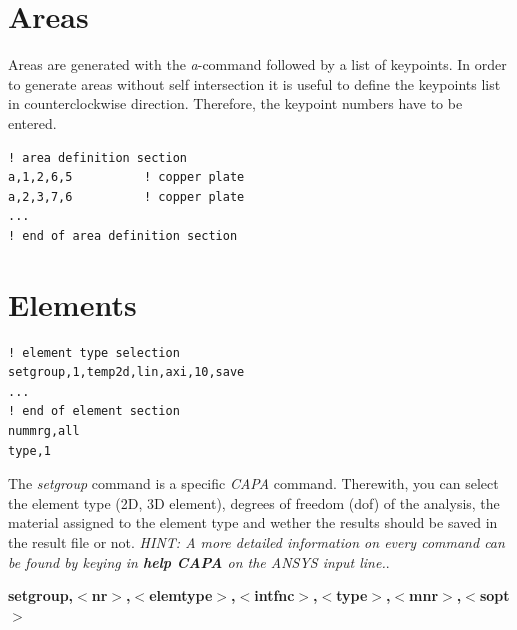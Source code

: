 \section*{Areas}
%
\begin{print}
Areas are generated with the {\em a}-command followed by a list of keypoints. In order to generate areas without self intersection it is useful to define the keypoints list in counterclockwise direction. Therefore, the keypoint numbers have to be entered.
\end{print}
%
\begin{verbatim}
! area definition section
a,1,2,6,5          ! copper plate
a,2,3,7,6          ! copper plate
...
! end of area definition section
\end{verbatim}
%
%
\begin{figure}[htb]
\begin{center}
\end{center}
\end{figure}
%
\newslide
%
\section*{Elements}
%
\begin{verbatim}
! element type selection
setgroup,1,temp2d,lin,axi,10,save 
...
! end of element section
nummrg,all
type,1
\end{verbatim}
%
\begin{print}
The {\em setgroup} command is a specific {\em CAPA} command. Therewith, you can select the element type (2D, 3D element), degrees of freedom (dof) of the analysis, the material assigned to the element type and wether the results should be saved in the result file or not. {\em HINT: A more detailed information on every command can be found by keying in {\bf help CAPA} on the ANSYS input line.}.\\
\end{print}
%
\vspace{3ex}
{\bf setgroup,$<$nr$>$,$<$elemtype$>$,$<$intfnc$>$,$<$type$>$,$<$mnr$>$,$<$sopt$>$}\\
%
\newslide
%
